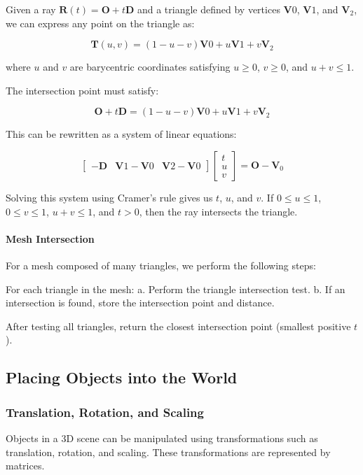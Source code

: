 \documentclass[12pt]{article}
\begin{document}
Given a ray \(\mathbf{R}(t) = \mathbf{O} + t\mathbf{D}\) and a triangle defined by vertices \(\mathbf{V}0\), \(\mathbf{V}1\), and \(\mathbf{V}_2\), we can express any point on the triangle as:

\[
    \mathbf{T}(u,v) = (1-u-v)\mathbf{V}0 + u\mathbf{V}1 + v\mathbf{V}_2
\]

where \(u\) and \(v\) are barycentric coordinates satisfying \(u \geq 0\), \(v \geq 0\), and \(u + v \leq 1\).

The intersection point must satisfy:

\[
    \mathbf{O} + t\mathbf{D} = (1-u-v)\mathbf{V}0 + u\mathbf{V}1 + v\mathbf{V}_2
\]

This can be rewritten as a system of linear equations:

\[
    \begin{bmatrix}
        -\mathbf{D} & \mathbf{V}1 - \mathbf{V}0 & \mathbf{V}2 - \mathbf{V}0
    \end{bmatrix}
    \begin{bmatrix}
        t \\ u \\ v
    \end{bmatrix}
    = \mathbf{O} - \mathbf{V}_0
\]

Solving this system using Cramer's rule gives us \(t\), \(u\), and \(v\). If \(0 \leq u \leq 1\), \(0 \leq v \leq 1\), \(u + v \leq 1\), and \(t > 0\), then the ray intersects the triangle.

\paragraph{Mesh Intersection}

For a mesh composed of many triangles, we perform the following steps:

For each triangle in the mesh:
a. Perform the triangle intersection test.
b. If an intersection is found, store the intersection point and distance.

After testing all triangles, return the closest intersection point (smallest positive \(t\)).

\subsection{Placing Objects into the World}
\subsubsection{Translation, Rotation, and Scaling}
Objects in a 3D scene can be manipulated using transformations such as translation, rotation, and scaling. These transformations are represented by matrices.
\end{document}
